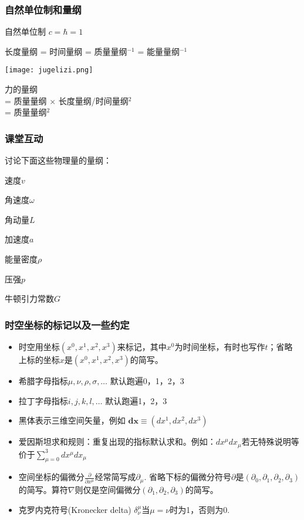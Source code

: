 \documentclass[CJK]{beamer}
\begin{document}
\begin{frame}
\frametitle{\bch 自然单位制和量纲 \ech}
\bch 自然单位制 \ech $c = \hbar  = 1$

\bch
长度量纲 = 时间量纲 = 质量量纲$^{-1}$ = 能量量纲$^{-1}$ 
\ech

{\vskip 0.2in}
\begin{minipage}{0.3\textwidth}
\texttt{[image: jugelizi.png]}
\end{minipage}
\begin{minipage}{0.6\textwidth}
\bch
力的量纲 \\
= 质量量纲 $\times$ 长度量纲/时间量纲$^2$ \\
= 质量量纲$^2$
\ech
\end{minipage}

\end{frame}

\begin{frame}
\frametitle{\bch 课堂互动\ech}
\bch
讨论下面这些物理量的量纲：

速度$v$

角速度$\omega$

角动量$L$

加速度$a$

能量密度$\rho$

压强$p$

牛顿引力常数$G$

\ech
\end{frame}



\begin{frame}
\frametitle{\bch 时空坐标的标记以及一些约定 \ech}
\bch
\begin{itemize}
\item{时空用坐标$(x^0, x^1, x^2, x^3)$来标记，其中$x^0$为时间坐标，有时也写作$t$；省略上标的坐标$x$是$(x^0, x^1, x^2, x^3)$的简写。}
\item{希腊字母指标$\mu, \nu, \rho, \sigma,\ldots$ 默认跑遍0，1，2，3}
\item{拉丁字母指标$i, j,  k, l,\ldots$ 默认跑遍1，2，3}
\item{黑体表示三维空间矢量，例如 $\mathbf{dx} \equiv (dx^1, dx^2, dx^3)$}
\item{爱因斯坦求和规则：重复出现的指标默认求和。例如：$dx^\mu dx_{\mu}$若无特殊说明等价于$\sum_{\mu = 0}^3 dx^\mu dx_{\mu}$} 
\item{空间坐标的偏微分$\frac{\partial}{\partial x^\mu}$经常简写成$\partial_\mu$. 省略下标的偏微分符号$\partial$是$(\partial_0,\partial_1,\partial_2,\partial_3)$的简写。算符$\nabla$则仅是空间偏微分$(\partial_1, \partial_2, \partial_3)$的简写。}
\item{克罗内克符号(Kronecker delta) $\delta^\mu_\nu$当$\mu = \nu$时为1，否则为0.}
\end{itemize}
\ech

\end{frame}
\end{document}

